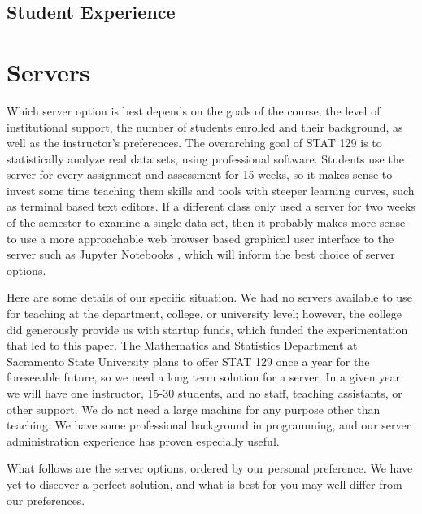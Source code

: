 \documentclass[12pt]{article}
\begin{document}
\subsection{Student Experience}
\label{sec:students}



\section{Servers}
\label{sec:serveropt}


Which server option is best depends on the goals of the course, the level of institutional support, the number of students enrolled and their background, as well as the instructor’s preferences.
The overarching goal of STAT 129 is to statistically analyze real data sets, using professional software.
Students use the server for every assignment and assessment for 15 weeks, so it makes sense to invest some time teaching them skills and tools with steeper learning curves, such as terminal based text editors.
If a different class only used a server for two weeks of the semester to examine a single data set, then it probably makes more sense to use a more approachable web browser based graphical user interface to the server such as Jupyter Notebooks \cite{kluyver2016jupyter}, which will inform the best choice of server options.

Here are some details of our specific situation.
We had no servers available to use for teaching at the department, college, or university level; however, the college did generously provide us with startup funds, which funded the experimentation that led to this paper.
The Mathematics and Statistics Department at Sacramento State University plans to offer STAT 129 once a year for the foreseeable future, so we need a long term solution for a server.
In a given year we will have one instructor, 15-30 students, and no staff, teaching assistants, or other support.
We do not need a large machine for any purpose other than teaching.
We have some professional background in programming, and our server administration experience has proven especially useful.

What follows are the server options, ordered by our personal preference.
We have yet to discover a perfect solution, and what is best for you may well differ from our preferences.

\end{document}
